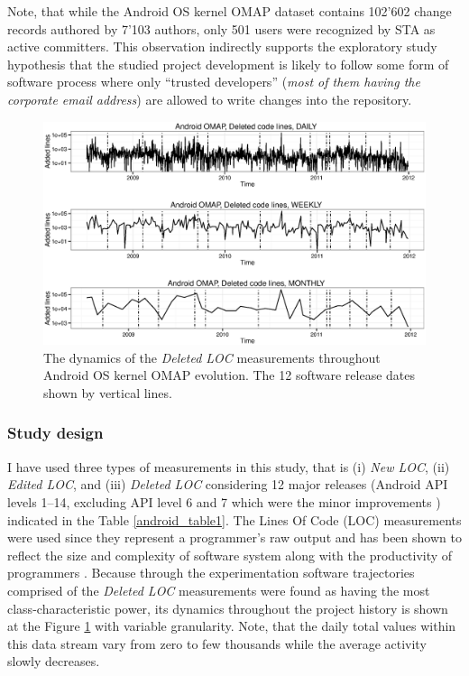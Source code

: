Note, that while the Android OS kernel OMAP dataset contains 102'602 change records authored by 7'103 authors, only 501 users were recognized by STA as active committers. This observation indirectly supports the exploratory study hypothesis that the studied project development is likely to follow some form of software process where only ``trusted developers'' (\textit{most of them having the corporate email address}) are allowed to write changes into the repository.

\begin{figure}[t]
   \centering
   \includegraphics[width=145mm]{figures/omap_removed_lines_plot.eps}
   \caption{The dynamics of the \textit{Deleted LOC} measurements throughout Android OS kernel OMAP evolution. 
   The 12 software release dates shown by vertical lines.}
   \label{fig:OMAP_dynamics}
\end{figure}

\subsubsection{Study design}
I have used three types of measurements in this study, that is (i) \textit{New LOC}, (ii) \textit{Edited LOC}, and (iii) \textit{Deleted LOC} considering 12 major releases (Android API levels 1--14, excluding API level 6 and 7 which were the minor improvements \cite{api-levels}) indicated in the Table \ref{android_table1}. The Lines Of Code (LOC) measurements were used since they represent a programmer's raw output and has been shown to reflect the size and complexity of software system along with the productivity of programmers  \cite{citeulike:341464} \cite{citeulike:13410945} \cite{citeulike:13410947}. Because through the experimentation software trajectories comprised of the \textit{Deleted LOC} measurements were found as having the most class-characteristic power, its dynamics throughout the project history is shown at the Figure \ref{fig:OMAP_dynamics} with variable granularity. Note, that the daily total values within this data stream vary from zero to few thousands while the average activity slowly decreases.


